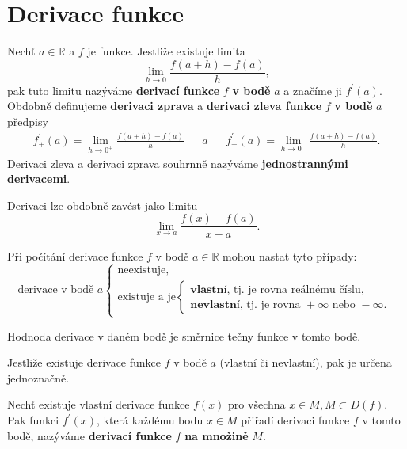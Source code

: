 \section{Derivace funkce}
\begin{definition}\label{derivace}
Nechť $a \in \mathbb R$ a $f$ je funkce. Jestliže existuje limita
$$\lim_{h\to 0} \frac{f(a+h)-f(a)}{h},$$
pak tuto limitu nazýváme \textbf{derivací funkce} $f$ \textbf{v bodě} $a$ a značíme ji $f^\prime (a).$
Obdobně definujeme \textbf{derivaci zprava} a \textbf{derivaci zleva funkce} $f$ \textbf{v bodě}
$a$ předpisy
\begin{align*}
    f_+^\prime(a) = \lim_{h\to 0^+} \frac{f(a+h)-f(a)}{h} & & a & & f_-^\prime(a) = \lim_{h\to 0^-} \frac{f(a+h)-f(a)}{h}.
\end{align*}
Derivaci zleva a derivaci zprava souhrnně nazýváme \textbf{jednostrannými derivacemi}.
\end{definition}

\begin{pozn}
    Derivaci lze obdobně zavést jako limitu
    $$\lim_{x\to a} \frac{f(x)-f(a)}{x-a}.$$
\end{pozn}

\begin{pozn}
     Při počítání derivace funkce $f$ v bodě $a\in \mathbb R$ mohou nastat
     tyto případy:
     $$
     \textrm{derivace v bodě } a \begin{cases}
        \textrm{neexistuje,} \\
        \textrm{existuje a je} \begin{cases}
            \textbf{vlastní}\textrm{, tj. je rovna reálnému číslu}, \\
            \textbf{nevlastní}\textrm{, tj. je rovna } +\infty \textrm{ nebo } - \infty.
        \end{cases}
     \end{cases}
     $$
\end{pozn}

\begin{pozn}
    Hodnoda derivace v daném bodě je směrnice tečny funkce v tomto bodě.
\end{pozn}

\begin{veta}
    Jestliže existuje derivace funkce $f$ v bodě $a$ (vlastní či nevlastní),
    pak je určena jednoznačně.
\end{veta}

\begin{definition}
Nechť existuje vlastní derivace funkce $f(x)$ pro všechna $x\in M, M\subset D(f).$
Pak funkci $f^\prime(x)$, která každému bodu $x\in M$ přiřadí derivaci funkce $f$
v tomto bodě, nazýváme \textbf{derivací funkce} $f$ \textbf{na množině} $M.$
\end{definition}

